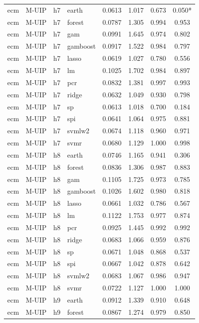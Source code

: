 \begin{ThreePartTable}
\begin{longtable}[t]{llclcccc}
\addlinespace
ecm & M-UIP & h7 & earth & 0.0613 & 1.017 & 0.673 & 0.050*\\
ecm & M-UIP & h7 & forest & 0.0787 & 1.305 & 0.994 & 0.953\\
ecm & M-UIP & h7 & gam & 0.0991 & 1.645 & 0.974 & 0.802\\
ecm & M-UIP & h7 & gamboost & 0.0917 & 1.522 & 0.984 & 0.797\\
ecm & M-UIP & h7 & lasso & 0.0619 & 1.027 & 0.780 & 0.556\\
ecm & M-UIP & h7 & lm & 0.1025 & 1.702 & 0.984 & 0.897\\
ecm & M-UIP & h7 & pcr & 0.0832 & 1.381 & 0.997 & 0.993\\
ecm & M-UIP & h7 & ridge & 0.0632 & 1.049 & 0.930 & 0.798\\
ecm & M-UIP & h7 & sp & 0.0613 & 1.018 & 0.700 & 0.184\\
ecm & M-UIP & h7 & spi & 0.0641 & 1.064 & 0.975 & 0.881\\
ecm & M-UIP & h7 & svmlw2 & 0.0674 & 1.118 & 0.960 & 0.971\\
ecm & M-UIP & h7 & svmr & 0.0680 & 1.129 & 1.000 & 0.998\\
\addlinespace
ecm & M-UIP & h8 & earth & 0.0746 & 1.165 & 0.941 & 0.306\\
ecm & M-UIP & h8 & forest & 0.0836 & 1.306 & 0.987 & 0.883\\
ecm & M-UIP & h8 & gam & 0.1105 & 1.725 & 0.973 & 0.785\\
ecm & M-UIP & h8 & gamboost & 0.1026 & 1.602 & 0.980 & 0.818\\
ecm & M-UIP & h8 & lasso & 0.0661 & 1.032 & 0.786 & 0.567\\
ecm & M-UIP & h8 & lm & 0.1122 & 1.753 & 0.977 & 0.874\\
ecm & M-UIP & h8 & pcr & 0.0925 & 1.445 & 0.992 & 0.992\\
ecm & M-UIP & h8 & ridge & 0.0683 & 1.066 & 0.959 & 0.876\\
ecm & M-UIP & h8 & sp & 0.0671 & 1.048 & 0.868 & 0.537\\
ecm & M-UIP & h8 & spi & 0.0667 & 1.042 & 0.878 & 0.642\\
ecm & M-UIP & h8 & svmlw2 & 0.0683 & 1.067 & 0.986 & 0.947\\
ecm & M-UIP & h8 & svmr & 0.0722 & 1.127 & 1.000 & 1.000\\
\addlinespace
ecm & M-UIP & h9 & earth & 0.0912 & 1.339 & 0.910 & 0.648\\
ecm & M-UIP & h9 & forest & 0.0867 & 1.274 & 0.979 & 0.850\\

\end{longtable}
\end{ThreePartTable}
